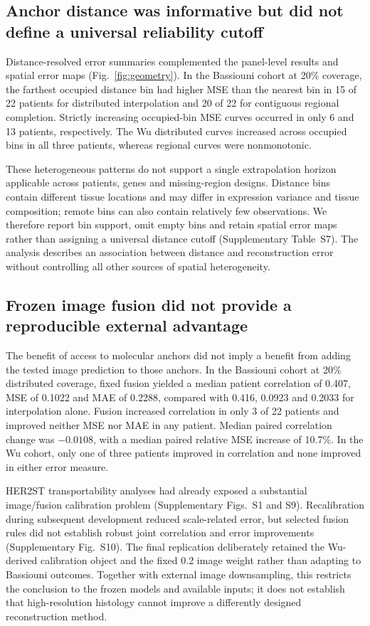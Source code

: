 \subsection{Anchor distance was informative but did not define a universal reliability cutoff}
Distance-resolved error summaries complemented the panel-level results and spatial error maps (Fig.~\ref{fig:geometry}). In the Bassiouni cohort at 20\% coverage, the farthest occupied distance bin had higher MSE than the nearest bin in 15 of 22 patients for distributed interpolation and 20 of 22 for contiguous regional completion. Strictly increasing occupied-bin MSE curves occurred in only 6 and 13 patients, respectively. The Wu distributed curves increased across occupied bins in all three patients, whereas regional curves were nonmonotonic.

These heterogeneous patterns do not support a single extrapolation horizon applicable across patients, genes and missing-region designs. Distance bins contain different tissue locations and may differ in expression variance and tissue composition; remote bins can also contain relatively few observations. We therefore report bin support, omit empty bins and retain spatial error maps rather than assigning a universal distance cutoff (Supplementary Table~S7). The analysis describes an association between distance and reconstruction error without controlling all other sources of spatial heterogeneity.


\FloatBarrier

\subsection{Frozen image fusion did not provide a reproducible external advantage}
The benefit of access to molecular anchors did not imply a benefit from adding the tested image prediction to those anchors. In the Bassiouni cohort at 20\% distributed coverage, fixed fusion yielded a median patient correlation of 0.407, MSE of 0.1022 and MAE of 0.2288, compared with 0.416, 0.0923 and 0.2033 for interpolation alone. Fusion increased correlation in only 3 of 22 patients and improved neither MSE nor MAE in any patient. Median paired correlation change was $-0.0108$, with a median paired relative MSE increase of 10.7\%. In the Wu cohort, only one of three patients improved in correlation and none improved in either error measure.

HER2ST transportability analyses had already exposed a substantial image/fusion calibration problem (Supplementary Figs.~S1 and S9). Recalibration during subsequent development reduced scale-related error, but selected fusion rules did not establish robust joint correlation and error improvements (Supplementary Fig.~S10). The final replication deliberately retained the Wu-derived calibration object and the fixed 0.2 image weight rather than adapting to Bassiouni outcomes. Together with external image downsampling, this restricts the conclusion to the frozen models and available inputs; it does not establish that high-resolution histology cannot improve a differently designed reconstruction method.

